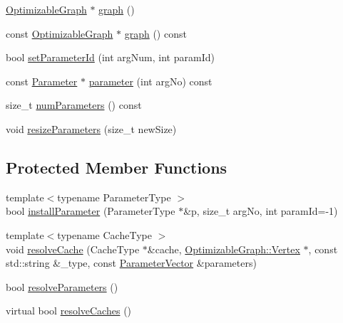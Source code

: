 \begin{DoxyCompactItemize}
\hyperlink{structg2o_1_1OptimizableGraph}{Optimizable\+Graph} $\ast$ \hyperlink{classg2o_1_1OptimizableGraph_1_1Edge_a3684190bf8e99f39f58ffadd0dfa6b05}{graph} ()
\item 
const \hyperlink{structg2o_1_1OptimizableGraph}{Optimizable\+Graph} $\ast$ \hyperlink{classg2o_1_1OptimizableGraph_1_1Edge_a08d9fca4079441e3aa07cc315cd77470}{graph} () const 
\item 
bool \hyperlink{classg2o_1_1OptimizableGraph_1_1Edge_ae535735e71365a547fd1a11fae5378f6}{set\+Parameter\+Id} (int arg\+Num, int param\+Id)
\item 
const \hyperlink{classg2o_1_1Parameter}{Parameter} $\ast$ \hyperlink{classg2o_1_1OptimizableGraph_1_1Edge_a78b63b89b3964c30b96a3404b20e2a7f}{parameter} (int arg\+No) const 
\item 
size\+\_\+t \hyperlink{classg2o_1_1OptimizableGraph_1_1Edge_a21c26247bdb33e6836d1f1c8536ad70c}{num\+Parameters} () const 
\item 
void \hyperlink{classg2o_1_1OptimizableGraph_1_1Edge_ac978364c99e36c7fced59ecb383ba171}{resize\+Parameters} (size\+\_\+t new\+Size)
\end{DoxyCompactItemize}
\subsection*{Protected Member Functions}
\begin{DoxyCompactItemize}
\item 
{\footnotesize template$<$typename Parameter\+Type $>$ }\\bool \hyperlink{classg2o_1_1OptimizableGraph_1_1Edge_a237bea2f2fb7cc6a9cf4ee5ee6fe4d88}{install\+Parameter} (Parameter\+Type $\ast$\&p, size\+\_\+t arg\+No, int param\+Id=-\/1)
\item 
{\footnotesize template$<$typename Cache\+Type $>$ }\\void \hyperlink{classg2o_1_1OptimizableGraph_1_1Edge_ad95f2883af693de56e46a2b272dc1cdc}{resolve\+Cache} (Cache\+Type $\ast$\&cache, \hyperlink{classg2o_1_1OptimizableGraph_1_1Vertex}{Optimizable\+Graph\+::\+Vertex} $\ast$, const std\+::string \&\+\_\+type, const \hyperlink{namespaceg2o_a85cc8f2c7db8cab47b2b269a7acd6785}{Parameter\+Vector} \&parameters)
\item 
bool \hyperlink{classg2o_1_1OptimizableGraph_1_1Edge_addadf494f3a1c8bf467a74454d771d0d}{resolve\+Parameters} ()
\item 
virtual bool \hyperlink{classg2o_1_1OptimizableGraph_1_1Edge_aa93e3a4f976b467994f4eb7679a04bf3}{resolve\+Caches} ()
\end{DoxyCompactItemize}
